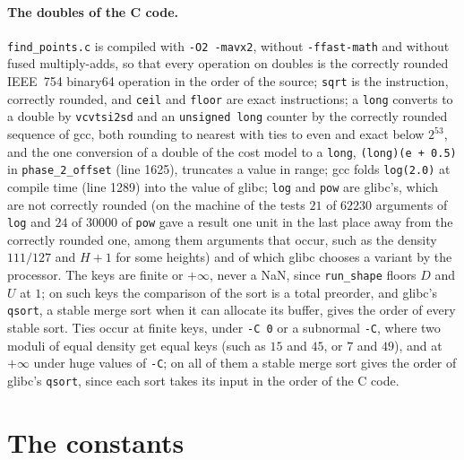 \paragraph{The doubles of the C code.} \verb|find_points.c| is compiled with \verb|-O2 -mavx2|,
without \verb|-ffast-math| and without fused multiply-adds, so that every operation on doubles is
the correctly rounded IEEE~754 binary64 operation in the order of the source; \verb|sqrt| is the
instruction, correctly rounded, and \verb|ceil| and \verb|floor| are exact instructions; a
\verb|long| converts to a double by \verb|vcvtsi2sd| and an \verb|unsigned long| counter by the
correctly rounded sequence of gcc, both rounding to nearest with ties to even and exact below
$2^{53}$, and the one conversion of a double of the cost model to a \verb|long|,
\verb|(long)(e + 0.5)| in \verb|phase_2_offset| (line 1625), truncates a value in range; gcc folds
\verb|log(2.0)| at compile time (line 1289) into the value of glibc; \verb|log| and \verb|pow| are
glibc's, which are not correctly rounded (on the machine of the tests $21$ of $62230$ arguments of
\verb|log| and $24$ of $30000$ of \verb|pow| gave a result one unit in the last place away from the
correctly rounded one, among them arguments that occur, such as the density $111/127$ and $H + 1$
for some heights) and of which glibc chooses a variant by the processor. The keys are finite or
$+\infty$, never a NaN, since \verb|run_shape| floors $D$ and $U$ at $1$; on such keys the
comparison of the sort is a total preorder, and glibc's \verb|qsort|, a stable merge sort when it
can allocate its buffer, gives the order of every stable sort. Ties occur at finite keys, under
\verb|-C 0| or a subnormal \verb|-C|, where two moduli of equal density get equal keys (such as $15$
and $45$, or $7$ and $49$), and at $+\infty$ under huge values of \verb|-C|; on all of them a stable
merge sort gives the order of glibc's \verb|qsort|, since each sort takes its input in the order of
the C code.

\section{The constants}\label{sec:moduliConstants}


